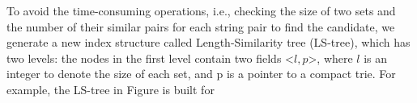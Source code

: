 To avoid the time-consuming operations, i.e., checking the size of two sets and the number of their similar pairs for each string pair to find the candidate, we generate a new index structure called Length-Similarity tree (LS-tree), which has two levels: the nodes  in the first level contain two fields <$l,p$>, where $l$ is an integer to denote the size of each set, and p is a pointer to a compact trie. For example, the LS-tree in Figure is built for

%
%
%
%
%
%
%
%
%
%
